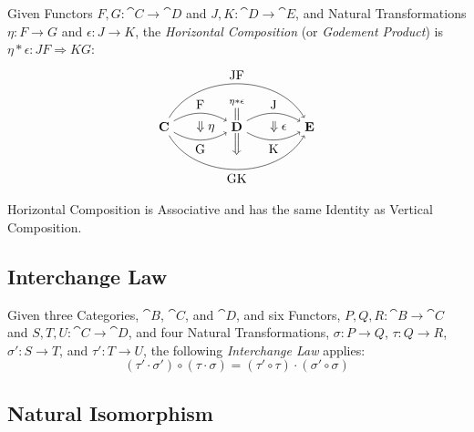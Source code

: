 Given Functors $F,G : \cat{C} \rightarrow \cat{D}$ and $J,K : \cat{D}
\rightarrow \cat{E}$, and Natural Transformations $\eta : F
\rightarrow G$ and $\epsilon : J \rightarrow K$, the \emph{Horizontal
  Composition} (or \emph{Godement Product}) is $\eta * \epsilon : JF
\Rightarrow KG$:
\[
  \begin{tikzpicture}
    \node (U) at (0,0) {$\stackrel{\eta*\epsilon}
      {\stackrel{\Big\|}{\Big\Downarrow}}$};
    \node [fill,color=white,scale=1.5] (W) at (0,0) {};
    \node (C) at (-2,0) {$\cat{C}$};
    \node (D) at (0,0) {$\cat{D}$};
    \node (E) at (2,0) {$\cat{E}$};
    \node (S) at (-1,0) {$\;\;\;\Downarrow\eta$};
    \node (T) at (1,0) {$\;\;\;\Downarrow\epsilon$};
    \draw[->,bend left] (C) to node [above] {F} (D);
    \draw[->,bend right] (C) to node [below] {G} (D);
    \draw[->,bend left] (D) to node [above] {J} (E);
    \draw[->,bend right] (D) to node [below] {K} (E);
    \draw[->,bend left=60] (C) to node [above] {JF} (E);
    \draw[->,bend right=60] (C) to node [below] {GK} (E);
  \end{tikzpicture}
\]

Horizontal Composition is Associative and has the same Identity as
Vertical Composition.



\subsection{Interchange Law}\label{sec:interchange_law}

Given three Categories, $\cat{B}$, $\cat{C}$, and $\cat{D}$,
and six Functors, $P,Q,R : \cat{B} \rightarrow \cat{C}$ and
$S,T,U : \cat{C} \rightarrow \cat{D}$, and four Natural
Transformations, $\sigma : P \rightarrow Q$, $\tau : Q \rightarrow R$,
$\sigma' : S \rightarrow T$, and $\tau' : T \rightarrow U$, the
following \emph{Interchange Law} applies:
\[
  (\tau' \cdot \sigma') \circ (\tau \cdot \sigma) =
  (\tau' \circ \tau) \cdot (\sigma' \circ \sigma)
\]



\subsection{Natural Isomorphism}\label{sec:natural_isomorphism}

